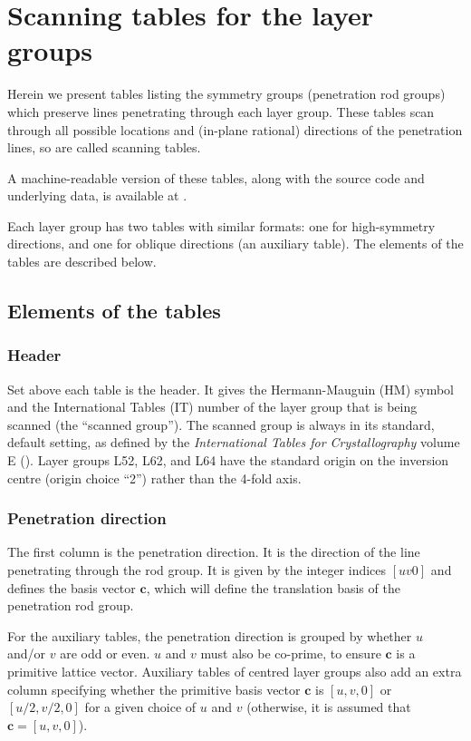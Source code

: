 \section{Scanning tables for the layer groups}

Herein we present tables listing the symmetry groups (penetration rod groups) which preserve lines penetrating through each layer group.
These tables scan through all possible locations and (in-plane rational) directions of the penetration lines, so are called scanning tables.

A machine-readable version of these tables, along with the source code and underlying data, is available at \cite{field_griffingroupscanning-tables-layer-group-data_2024}.

Each layer group has two tables with similar formats: one for high-symmetry directions, and one for oblique directions (an auxiliary table).
The elements of the tables are described below.

\subsection{Elements of the tables}

\subsubsection{Header}

Set above each table is the header.
It gives the Hermann-Mauguin (HM) symbol and the International Tables (IT) number of the layer group that is being scanned (the ``scanned group'').
The scanned group is always in its standard, default setting, as defined by the \textit{International Tables for Crystallography} volume E (\cite{kopsky_international_2010}).
Layer groups L52, L62, and L64 have the standard origin on the inversion centre (origin choice ``2'') rather than the 4-fold axis.

\subsubsection{Penetration direction}

The first column is the penetration direction.
It is the direction of the line penetrating through the rod group.
It is given by the integer indices $[uv0]$ and defines the basis vector $\mathbf{c}$, which will define the translation basis of the penetration rod group.

For the auxiliary tables, the penetration direction is grouped by whether $u$ and/or $v$ are odd or even.
$u$ and $v$ must also be co-prime, to ensure $\mathbf{c}$ is a primitive lattice vector.
Auxiliary tables of centred layer groups also add an extra column specifying whether the primitive basis vector $\mathbf{c}$ is $[u,v,0]$ or $[u/2,v/2,0]$ for a given choice of $u$ and $v$ (otherwise, it is assumed that $\mathbf{c}=[u,v,0]$).


